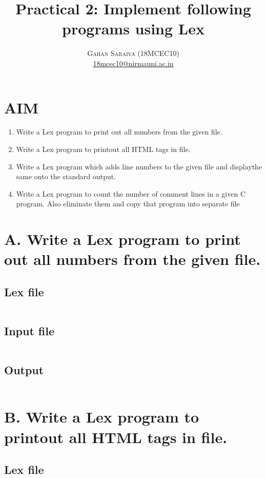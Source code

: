 \documentclass[paper=letter, fontsize=12pt]{article}
\date{}
\title{\vspace{-15mm}\fontsize{24pt}{10pt}\selectfont\textbf{Practical 2: Implement following programs using Lex}} %
\author{
	\large
	{\textsc{Gahan Saraiya (18MCEC10)}}\\[2mm]
	\normalsize \href{mailto:18mcec10@nirmauni.ac.in}{18mcec10@nirmauni.ac.in}\\[2mm] %
}
\date{}
\begin{document}
\maketitle %
\thispagestyle{fancy} %
\section{\LARGE AIM}
	\begin{enumerate}
		\item Write a Lex program to print out all numbers from the given file.
		\item Write a Lex program to printout all HTML tags in file.
		\item Write a Lex program   which   adds   line   numbers   to   the   given   file   and displaythe same onto the standard output.
		\item Write  a  Lex  program  to  count  the  number  of  comment  lines in  a  given  C program. Also eliminate them and copy that program into separate file
	\end{enumerate}

\section{{\LARGE A. Write a Lex program to print out all numbers from the given file.}}
\subsection{Lex file}
\inputminted{c}{../a/a.l}

\subsection{Input file}
\inputminted{text}{../a/f.in}

\subsection{Output}
\inputminted{text}{../a/out}


\section{{\LARGE B. Write a Lex program to printout all HTML tags in file.}}
\subsection{Lex file}
\inputminted{c}{../b/b.l}
\end{document}
